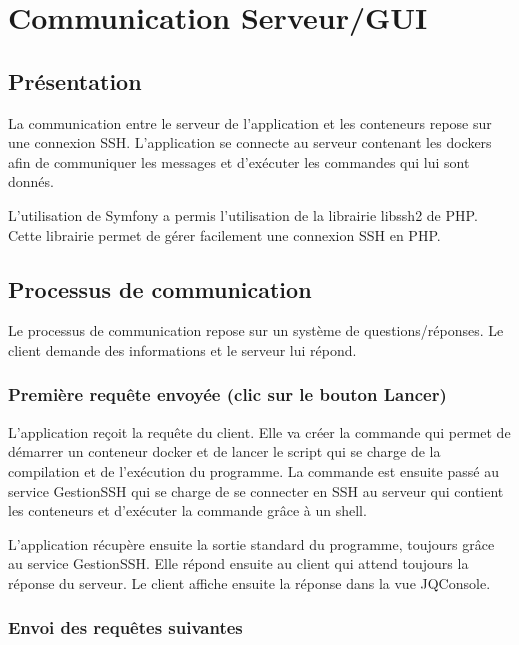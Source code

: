 \section{Communication Serveur/GUI}

\subsection{Présentation}

\par La communication entre le serveur de l'application et les conteneurs repose sur une connexion SSH. L'application se connecte au serveur contenant les dockers afin de communiquer les messages et d'exécuter les commandes qui lui sont donnés.

\par L'utilisation de Symfony a permis l'utilisation de la librairie libssh2 de PHP. Cette librairie permet de gérer facilement une connexion SSH en PHP.

\subsection{Processus de communication}

\par Le processus de communication repose sur un système de questions/réponses. Le client demande des informations et le serveur lui répond.

\subsubsection{Première requête envoyée (clic sur le bouton Lancer)}

\par L'application reçoit la requête du client. Elle va créer la commande qui permet de démarrer un conteneur docker et de lancer le script qui se charge de la compilation et de l'exécution du programme. La commande est ensuite passé au service GestionSSH qui se charge de se connecter en SSH au serveur qui contient les conteneurs et d'exécuter la commande grâce à un shell. 

\par L'application récupère ensuite la sortie standard du programme, toujours grâce au service GestionSSH. Elle répond ensuite au client qui attend toujours la réponse du serveur. Le client affiche ensuite la réponse dans la vue JQConsole.

\subsubsection{Envoi des requêtes suivantes}

